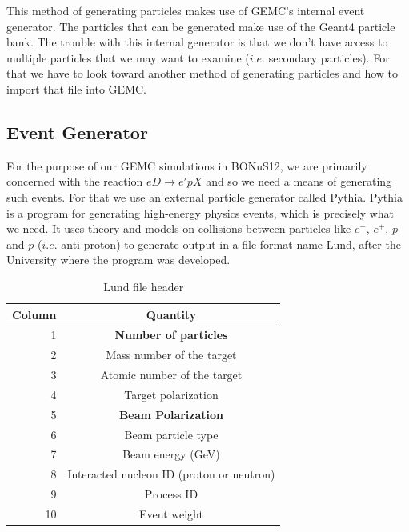 This method of generating particles makes use of GEMC's internal event generator. The particles that can be generated make use of the Geant4 particle bank. The trouble with this internal generator is that we don't have access to multiple particles that we may want to examine ($i.e.$ secondary particles). For that we have to look toward another method of generating particles and how to import that file into GEMC.

\subsection{Event Generator}
For the purpose of our GEMC simulations in BONuS12, we are primarily concerned with the reaction $eD \rightarrow e'pX$ and so we need a means of generating such events. For that we use an external particle generator called Pythia. Pythia is a program for generating high-energy physics events, which is precisely what we need. It uses theory and models on collisions between particles like $e^-$, $e^+$, $p$ and $\bar{p}$ ($i.e.$ anti-proton) to generate output in a file format name Lund, after the University where the program was developed.

\begin{table}[h!]
	\begin{center}
		\caption{Lund file header}
		\label{tab:lund_header}
		\begin{tabular}{r|c} %
			\rowcolor{cyan} \textbf{Column} & \textbf{Quantity} \\
			\hline
			1 & \textbf{Number of particles} \\
			\rowcolor{lightgray} 2 & Mass number of the target \\
			3 & Atomic number of the target \\
			\rowcolor{lightgray} 4 & Target polarization \\
			5 & \textbf{Beam Polarization} \\
			\rowcolor{lightgray} 6 & Beam particle type \\
			7 & Beam energy (GeV) \\
			\rowcolor{lightgray} 8 & Interacted nucleon ID (proton or neutron) \\
			9 & Process ID \\
			\rowcolor{lightgray} 10 & Event weight \\
			\hline
		\end{tabular}
	\end{center}
\end{table}


